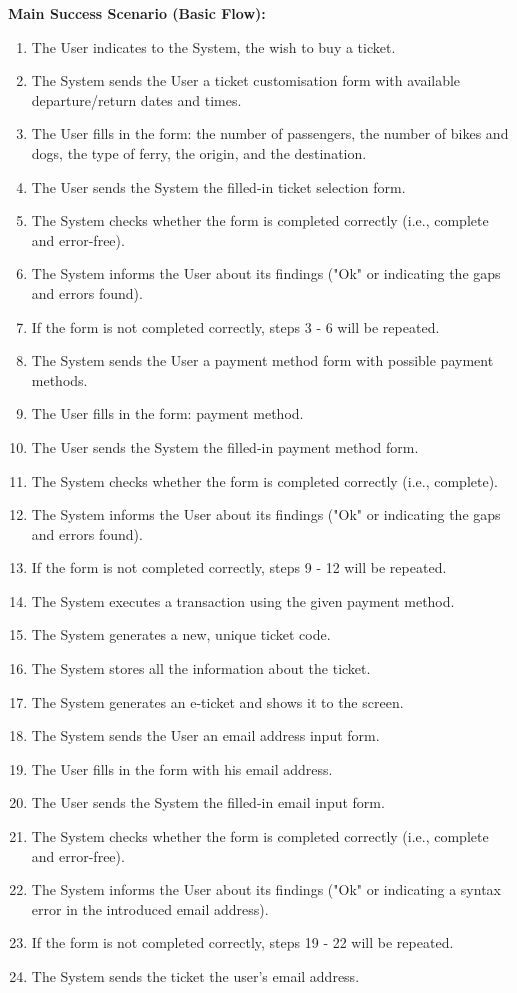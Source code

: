 \textbf{Main Success Scenario (Basic Flow):}
\begin{enumerate}
\item The User indicates to the System, the wish to buy a ticket.
\item The System sends the User a ticket customisation form with available departure/return dates and times.
\item The User fills in the form: the number of passengers, the number of bikes and dogs, the type of ferry, the origin, and the destination.
\item The User sends the System the filled-in ticket selection form.
\item The System checks whether the form is completed correctly (i.e., complete and error-free).
\item The System informs the User about its findings ("Ok" or indicating the gaps and errors found).
\item If the form is not completed correctly, steps 3 - 6 will be repeated.
\item The System sends the User a payment method form with possible payment methods.
\item The User fills in the form: payment method.
\item The User sends the System the filled-in payment method form.
\item The System checks whether the form is completed correctly (i.e., complete).
\item The System informs the User about its findings ("Ok" or indicating the gaps and errors found).
\item If the form is not completed correctly, steps 9 - 12 will be repeated.
\item The System executes a transaction using the given payment method.
\item The System generates a new, unique ticket code.
\item The System stores all the information about the ticket.
\item The System generates an e-ticket and shows it to the screen.
\item The System sends the User an email address input form.
\item The User fills in the form with his email address.
\item The User sends the System the filled-in email input form.
\item The System checks whether the form is completed correctly (i.e., complete and error-free).
\item The System informs the User about its findings ("Ok" or indicating a syntax error in the introduced email address).
\item If the form is not completed correctly, steps 19 - 22 will be repeated.
\item The System sends the ticket the user's email address.
\end{enumerate}
